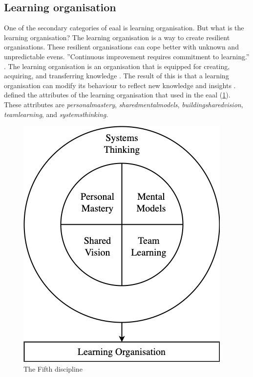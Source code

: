 \subsection{Learning organisation}
\label{sub:learningorganisation}
One of the secondary categories of \acrlong{eaal} is learning organisation. But what is the learning organisation? The learning organisation is a way to create resilient organisations. These resilient organisations can cope better with unknown and unpredictable evens. ''Continuous improvement requires commitment to learning.'' \parencite{Garvin1993}. The learning organisation is an organisation that is equipped for creating, acquiring, and transferring knowledge \parencite{Garvin1993}. The result of this is that a learning organisation can modify its behaviour to reflect new knowledge and insights \parencite{Garvin1993}. \textcite{Senge1994} defined the \glspl{attribute} of the learning organisation that \textcite{Botjes2021} used in the \acrlong{eaal} (\cref{fig:fithdiscipline}). These attributes are \textit{\gls{personalmastery}}, \textit{\glspl{sharedmentalmodel}}, \textit{\gls{buildingsharedvision}}, \textit{\gls{teamlearning}}, and \textit{\gls{systemsthinking}}.
\begin{figure}[H]
	\centering
	\includegraphics[width=0.4\linewidth]{images/fithdiscipline}
	\caption[The Fifth discipline \parencite{Senge1994}]{The Fifth discipline \parencite{Senge1994}}
	\label{fig:fithdiscipline}
\end{figure}

